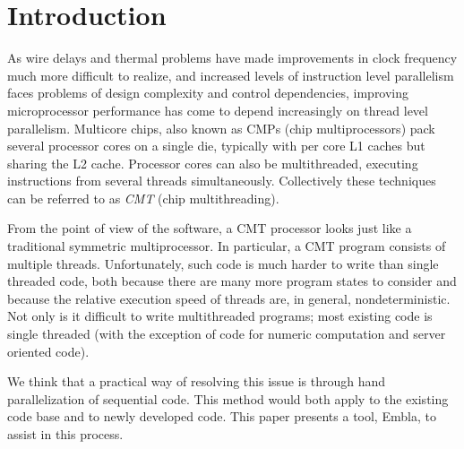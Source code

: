 \section{Introduction}

As wire delays and thermal problems have made improvements in clock
frequency much more difficult to realize, and increased levels of
instruction level parallelism faces problems of design complexity and
control dependencies, improving microprocessor performance has come to
depend increasingly on thread level parallelism. Multicore chips, also
known as CMPs (chip multiprocessors) pack several processor cores on a
single die, typically with per core L1 caches but sharing the L2
cache. Processor cores can also be multithreaded, executing
instructions from several threads simultaneously. Collectively 
these techniques can be referred to as {\em CMT} (chip multithreading).

From the point of view of the software, a CMT processor looks just
like a traditional symmetric multiprocessor. In particular, a CMT
program consists of multiple threads. Unfortunately, such code is much
harder to write than single threaded code, both because there are many
more program states to consider and because the relative execution
speed of threads are, in general, nondeterministic.  Not only is it
difficult to write multithreaded programs; most existing code is
single threaded (with the exception of code for numeric computation
and server oriented code).

We think that a practical way of resolving this issue is through hand
parallelization of sequential code. This method would both apply to
the existing code base and to newly developed code. This paper
presents a tool, Embla, to assist in this process.



